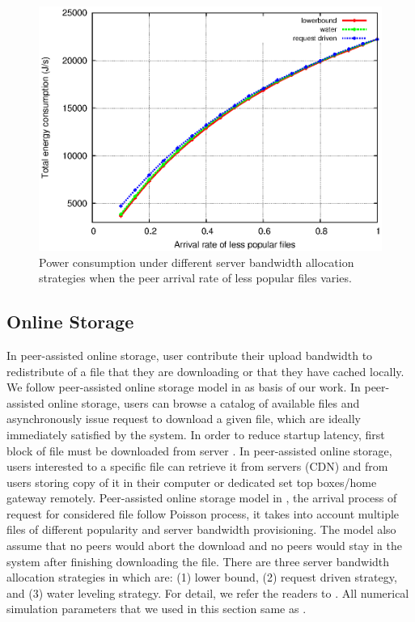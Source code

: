 \documentclass[conference]{IEEEtran}
\begin{document}
\begin{figure}[ht]
\centering
\begin{minipage}[b]{0.3\linewidth}
	\includegraphics[scale=0.4]{graphs/totalconsumption.eps}
	\caption{Power consumption under different server bandwidth allocation strategies when the peer arrival rate of less popular files varies.}
	\label{fig:totalpop}
\end{minipage}
\label{fig:popularity}
\end{figure}


\subsection{Online Storage}

In peer-assisted online storage, user contribute their upload bandwidth to redistribute of a file that they are downloading or that they have cached locally.
We follow peer-assisted online storage model in \cite{Sun:2009:POS:1542245.1542249} as basis of our work. 
In peer-assisted online storage, users can browse a catalog of available files and asynchronously issue request to download a given file, which are ideally immediately satisfied by the system.
In order to reduce startup latency, first block of file must be downloaded from server \cite{5199550}.
In peer-assisted online storage, users interested to a specific file can retrieve it from servers (CDN) and from users storing copy of it in their computer or dedicated set top boxes/home gateway remotely.  
Peer-assisted online storage model in \cite{Sun:2009:POS:1542245.1542249}, the arrival process of request for considered file follow Poisson process, it takes into account multiple files of different popularity and server bandwidth provisioning.
The model also assume that no peers would abort the download and no peers would stay in the system after finishing downloading the file.
There are three server bandwidth allocation strategies in \cite{Sun:2009:POS:1542245.1542249} which are: (1) lower bound, (2) request driven strategy, and (3) water leveling strategy.
For detail, we refer the readers to \cite{Sun:2009:POS:1542245.1542249,5199550,5061997}.
All numerical simulation parameters that we used in this section same as \cite{Sun:2009:POS:1542245.1542249}.
\end{document}
